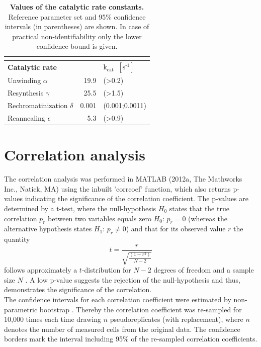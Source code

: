 \begin{table}[H]
	
\begin{center}
	\begin{tabular}{lrl}
		
		\multicolumn{3}{l}{} \\
		\hline
		\textbf{Catalytic rate}    && \textbf{$\text{k}_{\text{cat}}$ $\, \left[\text{s}^{\text{-1}}\right]$}  \\
		\hline
		Unwinding  $\alpha$                                     & 19.9& (>0.2)                 \\
		Resynthesis $\gamma$                                 & 25.5 &(>1.5)     \\
		Rechromatinization $\delta$                         & 0.001 &(0.001;0.0011)                   \\
		Reannealing  $\epsilon$                                & 5.3&(>0.9)    \\
		\hline
	\end{tabular}
	\caption{\textbf{Values of the catalytic rate constants.}  Reference parameter set and 95\% confidence intervals (in parentheses) are shown. In case of practical non-identifiability only the lower confidence bound is given.}
	\label{tab:parameter_catalyticRates}
	\end{center}
\end{table}


\section{Correlation analysis}
\label{apendix:correlationAnalysis}
The correlation analysis was performed in MATLAB (2012a, The Mathworks Inc., Natick, MA) using the inbuilt 'corrcoef' function, which also returns p-values indicating the significance of the correlation coefficient. The p-values are determined by a t-test, where the null-hypothesis $H_0$ states that the true correlation $p_r$ between two variables equals zero $H_0: \, p_r=0$ (whereas the alternative hypothesis states $H_1: \, p_r\neq0$) and that for its observed value $r$ the quantity 
\begin{equation}
t = \frac{r}{\sqrt{\frac{(1-r^2)}{N-2}}}
\end{equation}     
follows approximately a $t$-distribution for $N-2$ degrees of freedom and a sample size $N$ \cite{Kendall1979,Fisher1958}. A low p-value suggests the rejection of the null-hypothesis and thus, demonstrates the significance of the correlation.\\
The confidence intervals for each correlation coefficient were estimated by non-parametric bootstrap \cite{Efron1979}. Thereby the correlation coefficient was re-sampled for 10,000 times each time drawing $n$ pseudoreplicates (with replacement), where $n$ denotes the number of measured cells from the original data. The confidence borders mark the interval including 95\% of the re-sampled correlation coefficients.\\ 

